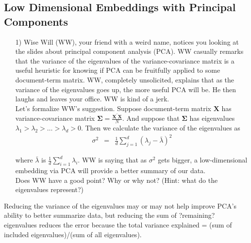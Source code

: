 \documentclass[12pt,letterpaper]{article}
\begin{document}
\subsection*{Low Dimensional Embeddings with Principal Components}

\begin{itemize}
\item[1)]  Wise Will (WW), your friend with a weird name, notices you looking at the slides about principal component analysis (PCA).   WW casually remarks that the variance of the eigenvalues of the variance-covariance matrix is a useful heuristic for knowing if PCA can be fruitfully applied to some document-term matrix.  WW, completely unsolicited, explains that as the variance of the eigenvalues goes up, the more useful PCA will be.  He then laughs and leaves your office.  WW is kind of a jerk.   \\

Let's formalize WW's suggestion. Suppose document-term matrix $\boldsymbol{X}$ has variance-covariance matrix $\boldsymbol{\Sigma} = \frac{\boldsymbol{X}^{'}\boldsymbol{X}}{N}$.  And suppose that $\boldsymbol{\Sigma}$ has eigenvalues $\lambda_{1}>\lambda_{2}>\hdots > \lambda_{d}>0$. Then we calculate the variance of the eigenvalues as
\begin{eqnarray}
\sigma^{2} & = & \frac{1}{d} \sum_{j=1}^{d}(\lambda_{j} - \bar{\lambda})^{2} \nonumber
\end{eqnarray}

where $\bar{\lambda}$ is $\frac{1}{d} \sum_{i=1}^{d} \lambda_{i}$. WW is saying that as $\sigma^{2}$ gets bigger, a low-dimensional embedding via PCA will provide a better summary of our data.   \\

Does WW have a good point?  Why or why not? (Hint: what do the eigenvalues represent?)
\end{itemize}

\noindent Reducing the variance of the eigenvalues may or may not help improve PCA's ability to better summarize data, but reducing the sum of ?remaining? eigenvalues reduces the error because the total variance explained = (sum of included eigenvalues)/(sum of all eigenvalues). 
\end{document}
